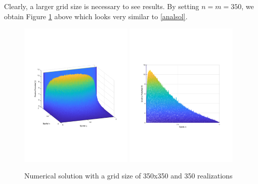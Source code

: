 \documentclass{amsart}
\begin{document}
Clearly, a larger grid size is necessary to see results. By setting $n=m=350$, we obtain Figure \ref{finalsolution} above which looks very similar to \ref{analsol}.

\begin{figure}[h]
	\caption{Numerical solution with a grid size of 350x350 and 350 realizations}
	\label{finalsolution}
	\includegraphics[width=0.48\textwidth]{solution_Dec11_9hrs_isoview.pdf}
	\includegraphics[width=0.48\textwidth]{solution_Dec11_9hrs_sideview.pdf}
\end{figure}
\end{document}
